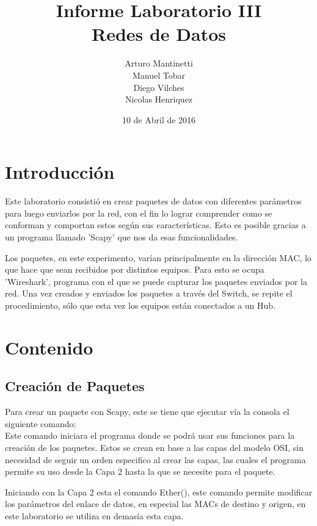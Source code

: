 \documentclass[spanish]{udpreport}
\title{Informe Laboratorio III \\ Redes de Datos}
\author{Arturo Mantinetti \\ Manuel Tobar \\ Diego Vilches \\ Nicolas Henriquez}
\date{10 de Abril de 2016} %
\begin{document}
\maketitle

\tableofcontents

\chapter{Introducción}

Este laboratorio consistió en crear paquetes de datos con diferentes parámetros para luego enviarlos por la red, con el fin lo lograr comprender como se conforman y comportan estos según sus características. Esto es posible gracias a un programa llamado 'Scapy' que nos da esas funcionalidades. 

Los paquetes, en este experimento, varían principalmente en la dirección MAC, lo que hace que sean recibidos por distintos equipos. Para esto se ocupa 'Wireshark', programa con el que se puede capturar los paquetes enviados por la red.  Una vez creados y enviados los paquetes a través del Switch, se repite el procedimiento, sólo que esta vez los equipos están conectados a un Hub. 



\chapter{Contenido}

\section{Creación de Paquetes}
Para crear un paquete con Scapy, este se tiene que ejecutar vía la consola el siguiente comando:
\\


Este comando iniciara el programa donde se podrá usar sus funciones para la creación de los paquetes. Estos se crean en base a las capas del modelo OSI, sin necesidad de seguir un orden especifico al crear las capas, las cuales el programa permite su uso desde la Capa 2 hasta la que se necesite para el paquete.

Iniciando con la Capa 2 esta el comando Ether(), este comando permite modificar los parámetros del enlace de datos, en especial las MACs de destino y origen, en este laboratorio se utiliza en demasía esta capa.
\end{document}
